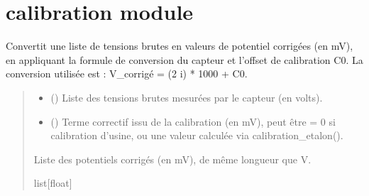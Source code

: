 \documentclass[letterpaper,10pt,english]{sphinxmanual}
\begin{document}
\sphinxstepscope


\section{calibration module}
\label{\detokenize{calibration:module-calibration}}\label{\detokenize{calibration:calibration-module}}\label{\detokenize{calibration::doc}}

\begin{fulllineitems}
\label{\detokenize{calibration:calibration.V_real_f}}
\pysigstartsignatures
\pysiglinewithargsret
{}
{\sphinxparamcomma {}}
{}
\pysigstopsignatures
\sphinxAtStartPar

Convertit une liste de tensions brutes en valeurs de potentiel corrigées (en mV),
en appliquant la formule de conversion du capteur et l’offset de calibration C0.
La conversion utilisée est : V\_corrigé = (2 \sphinxhyphen{} i) * 1000 + C0.
\begin{quote}\begin{description}
\begin{itemize}
\item {} 
\sphinxAtStartPar
{} (\sphinxstyleliteralemphasis{\sphinxupquote{{[}}}\sphinxstyleliteralemphasis{\sphinxupquote{{]}}}) \textendash{} Liste des tensions brutes mesurées par le capteur (en volts).

\item {} 
\sphinxAtStartPar
{} () \textendash{} Terme correctif issu de la calibration (en mV), peut être = 0 si
calibration d’usine, ou une valeur calculée via calibration\_etalon().

\end{itemize}

\sphinxAtStartPar
Liste des potentiels corrigés (en mV), de même longueur que V.

\sphinxAtStartPar
list{[}float{]}

\end{description}\end{quote}

\end{fulllineitems}
\end{document}
